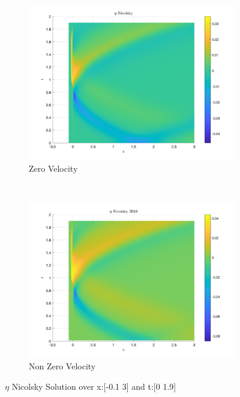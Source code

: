 \documentclass{article}
\begin{document}
\begin{figure}[t!]
    \centering
    \begin{subfigure}[b]{0.5\textwidth}
        \centering
        \includegraphics[scale=.25]{images/eta_Nicolsky_0u.png} 
        \caption{Zero Velocity}
    \end{subfigure}%
    ~ 
    \begin{subfigure}[b]{0.5\textwidth}
        \centering
        \includegraphics[scale=.25]{images/eta_Nicolsky_non0u.png}
        \caption{Non Zero Velocity}
    \end{subfigure}
    \caption{$\eta$ Nicolsky Solution over x:[-0.1 3] and t:[0 1.9]}
\end{figure}
\end{document}
